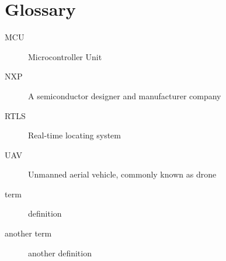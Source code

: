 \section{Glossary}

\begin{description}
\item [MCU] Microcontroller Unit
\item [NXP] A semiconductor designer and manufacturer company
\item [RTLS] Real-time locating system
\item [UAV] Unmanned aerial vehicle, commonly known as drone

\item [term] definition
\item [another term] another definition
\end{description}